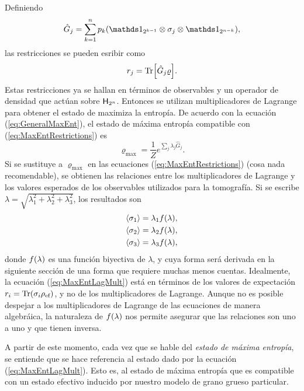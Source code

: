 Definiendo
\begin{equation}\label{eq:GhatNM}
    \hat{G}_{j}=\sum_{k=1}^{n}p_{k}(\Id_{2^{k-1}}\otimes\sigma_{j}\otimes\Id_{2^{n-k}}),
\end{equation}
las restricciones se pueden esribir como
\begin{equation}\label{eq:MaxEntRestrictions}
    r_{j}=\Tr[\hat{G}_{j}\varrho].
\end{equation}
Estas restricciones ya se hallan en términos de observables y un operador de densidad que actúan sobre ${\sf H}_{2^{n}}$. Entonces se utilizan multiplicadores de Lagrange para obtener el estado de maximiza la entropía. De acuerdo con la ecuación (\ref{eq:GeneralMaxEnt}), el estado de máxima entropía compatible con (\ref{eq:MaxEntRestrictions}) es
\begin{equation}\label{eq:MaxEntLagMult}
    \varrho_{\max}=\frac{1}{Z}e^{\sum_{j}\lambda_{j}\hat{G}_{j}}.
\end{equation}
Si se sustituye a $\varrho_{\max}$ en las ecuaciones (\ref{eq:MaxEntRestrictions}) (cosa nada recomendable), se obtienen las relaciones entre los multiplicadores de Lagrange y los valores esperados de los observables utilizados para la tomografía. Si se escribe $\lambda=\sqrt{\lambda_{1}^{2}+\lambda_{2}^{2}+\lambda_{3}^{2}}$, los resultados son
\begin{align}\label{eq:MaxEntExpVals}
    \begin{split}
    \expval{\sigma_{1}}&=\lambda_{1}f(\lambda),\\
    \expval{\sigma_{2}}&=\lambda_{2}f(\lambda),\\
    \expval{\sigma_{3}}&=\lambda_{3}f(\lambda),
    \end{split}
\end{align}
donde $f(\lambda)$ es una función biyectiva de $\lambda$, y cuya forma será derivada en la siguiente sección de una forma que requiere muchas menos cuentas. Idealmente, la ecuación (\ref{eq:MaxEntLagMult}) está en términos de los valores de expectación $r_{i}=\Tr(\sigma_{i}\rho_{\text{ef}})$, y no de los multiplicadores de Lagrange. Aunque no es posible despejar a los multiplicadores de Lagrange de las ecuaciones de manera algebráica, la naturaleza de $f(\lambda)$ nos permite asegurar que las relaciones son uno a uno y que tienen inversa.

A partir de este momento, cada vez que se hable del \textit{estado de máxima entropía}, se entiende que se hace referencia al estado dado por la ecuación (\ref{eq:MaxEntLagMult}). Esto es, al estado de máxima entropía que es compatible con un estado efectivo inducido por nuestro modelo de grano grueso particular.